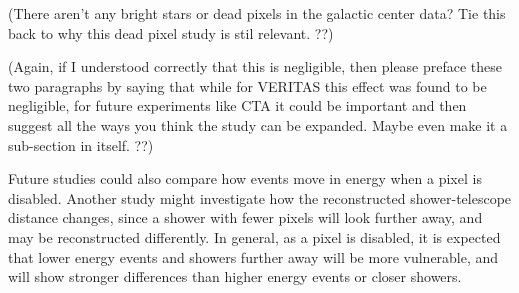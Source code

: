     {\color{red}(There aren't any bright stars or dead pixels in the galactic center data? Tie this back to why this dead pixel study is stil relevant. ??)}
    
    {\color{red}(Again, if I understood correctly that this is negligible, then please preface these two paragraphs by saying that while for VERITAS this effect was found to be negligible, for future experiments like CTA it could be important and then suggest all the ways you think the study can be expanded. Maybe even make it a sub-section in itself. ??)}

    Future studies could also compare how events move in energy when a pixel is disabled.
    Another study might investigate how the reconstructed shower-telescope distance changes, since a shower with fewer pixels will look further away, and may be reconstructed differently.
    In general, as a pixel is disabled, it is expected that lower energy events and showers further away will be more vulnerable, and will show stronger differences than higher energy events or closer showers.



